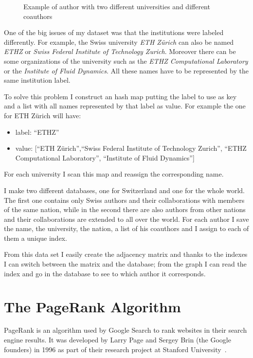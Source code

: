 \documentclass[]{usiinfbachelorproject}
\begin{document}
\begin{figure}
\begin{center}
\begin{tikzpicture}[x=0.75pt,y=0.75pt,yscale=-0.7,xscale=0.7]
\end{tikzpicture}
\caption{Example of author with two different universities and different coauthors} \label{fig:twoUni}
\end{center}
\end{figure}

One of the big issues of my dataset was that the institutions were labeled differently. For example, the Swiss university \textit{ETH Z\"{u}rich} can also be named \textit{ETHZ} or \textit{Swiss Federal Institute of Technology Zurich}.  Moreover there can be some organizations of the university such as the \textit{ETHZ Computational Laboratory} or the \textit{Institute of Fluid Dynamics}. All these names have to be represented by the same institution label. 

To solve this problem I construct an hash map putting the label to use as key and a list with all names represented by that label as value. For example the one for ETH Z\"{u}rich will have: 
\begin{itemize}
\item label:  ``ETHZ''
\item value:  [``ETH Z\"{u}rich'',``Swiss Federal Institute of Technology Zurich'', ``ETHZ Computational Laboratory'', ``Institute of Fluid Dynamics'']
\end{itemize}

For each university I scan this map and reassign the corresponding name.

I make two different databases, one for Switzerland and one for the whole world. The first one contains only Swiss authors and their collaborations with members of the same nation, while in the second there are also authors from other nations and their collaborations are extended to all over the world. For each author I save the name, the university, the nation, a list of his coauthors and I assign to each of them a unique index. 

From this data set I easily create the adjacency matrix and thanks to the indexes I can switch between the matrix and the database; from the graph I can read the index and go in the database to see to which author it corresponds.





\section{The PageRank Algorithm} \label{sec:pagerank} 
PageRank is an algorithm used by Google Search to rank websites in their search engine results. It was developed by  Larry Page and  Sergey Brin (the Google founders) in 1996 as part of their research project at Stanford University~\cite{pagerank}.
\end{document}
